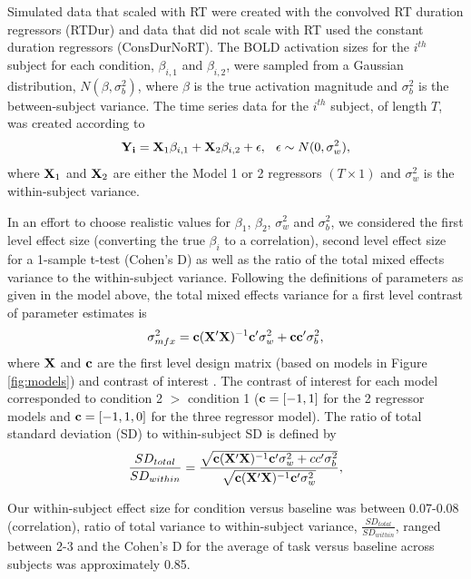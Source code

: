 \documentclass[titlepage,12pt] {article}
\begin{document}
Simulated data that scaled with RT were created with the convolved RT duration regressors (RTDur) and data that did not scale with RT used the constant duration regressors (ConsDurNoRT).  The BOLD activation sizes for the $i^{th}$ subject for each condition, $\beta_{i, 1}$ and $\beta_{i,2}$, were  sampled from a Gaussian distribution, $N(\beta, \sigma_b^2)$,  where $\beta$ is the true activation magnitude and $\sigma^2_b$ is the between-subject variance.  The time series data for the $i^{th}$ subject, of length $T$, was created according to 
\begin{equation} \label{eq:timeseries}
   \vb{Y_i} = \vb{X}_{1}\beta_{i, 1}  +  \vb{X}_{2}\beta_{i, 2} + \epsilon, \hspace{.1in} \epsilon \sim N(0, \sigma^2_w), 
\end{equation}
where $\vb{X}_{1}$ and $\vb{X}_{2}$  are either the Model 1 or 2 regressors $(T\times 1)$  and $\sigma^2_w$ is the within-subject variance.  


In an effort to choose realistic values for $\beta_1$, $\beta_2$, $\sigma^2_w$ and $\sigma^2_b$, we considered the first level effect size (converting the true $\beta_i$ to a  correlation), second level effect size for a 1-sample t-test (Cohen's D) as well as the ratio of the total mixed effects variance to the within-subject variance.  Following the definitions of parameters as given in the model above, the total mixed effects variance for a first level contrast of parameter estimates is
\begin{equation} \label{eq:mfxvar}
 \sigma^2_{mfx} =  \vb{c}(\vb{X}'\vb{X})^{-1}\vb{c}'\sigma^2_{w} +\vb{c}\vb{c}'\sigma^2_b,
\end{equation}
where $\vb{X}$ and $\vb{c}$ are the first level design matrix (based on models in Figure \ref{fig:models}) and contrast of interest \citep{mumford_modeling_2006}.  The contrast of interest for each model corresponded to condition 2 $>$ condition 1 ($\vb{c}=[-1,1]$ for the 2 regressor models and $\vb{c}=[-1,1, 0]$ for the three regressor model).  The ratio of total standard deviation (SD) to within-subject SD is defined by
\begin{equation}\label{eq:sd_ratio}
\frac{SD_{total}}{SD_{within}} = \frac{\sqrt{\vb{c}(\vb{X}'\vb{X})^{-1}\vb{c}'\sigma^2_{w} + cc'\sigma^2_b}} {\sqrt{\vb{c}(\vb{X}'\vb{X})^{-1}\vb{c}'\sigma^2_{w}}},
\end{equation}

Our within-subject effect size for condition versus baseline was between 0.07-0.08 (correlation), ratio of total variance to within-subject variance, $\frac{SD_{total}}{SD_{within}}$,  ranged between 2-3 and the Cohen's D for the average of task versus baseline across subjects was approximately 0.85.
\end{document}
